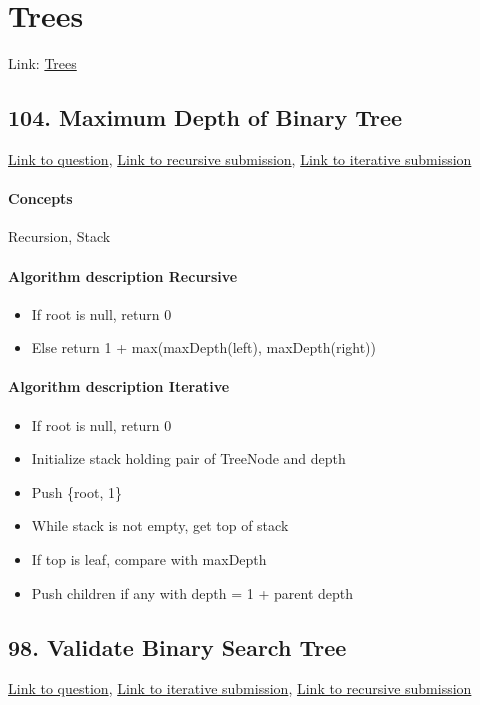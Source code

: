 \documentclass[11pt]{book}
\begin{document}
\newpage

\section{Trees}
Link: \href{https://leetcode.com/explore/interview/card/top-interview-questions-easy/94/trees/}{Trees}

\subsection{104. Maximum Depth of Binary Tree}
\href{https://leetcode.com/problems/maximum-depth-of-binary-tree/}{Link to question},
\href{https://leetcode.com/submissions/detail/334227706/}{Link to recursive submission},
\href{https://leetcode.com/submissions/detail/334260483/}{Link to iterative submission}
\paragraph{Concepts}
Recursion, Stack
\paragraph{Algorithm description Recursive}
\begin{itemize}
    \item If root is null, return 0
    \item Else return 1 + max(maxDepth(left), maxDepth(right))
\end{itemize}
\paragraph{Algorithm description Iterative}
\begin{itemize}
    \item If root is null, return 0
    \item Initialize stack holding pair of TreeNode and depth
    \item Push \{root, 1\}
    \item While stack is not empty, get top of stack
    \item If top is leaf, compare with maxDepth
    \item Push children if any with depth = 1 + parent depth
\end{itemize}

\subsection{98. Validate Binary Search Tree}
\href{https://leetcode.com/problems/validate-binary-search-tree/}{Link to question},
\href{https://leetcode.com/submissions/detail/334300642/}{Link to iterative submission},
\href{https://leetcode.com/submissions/detail/334297136/}{Link to recursive submission}
\end{document}
